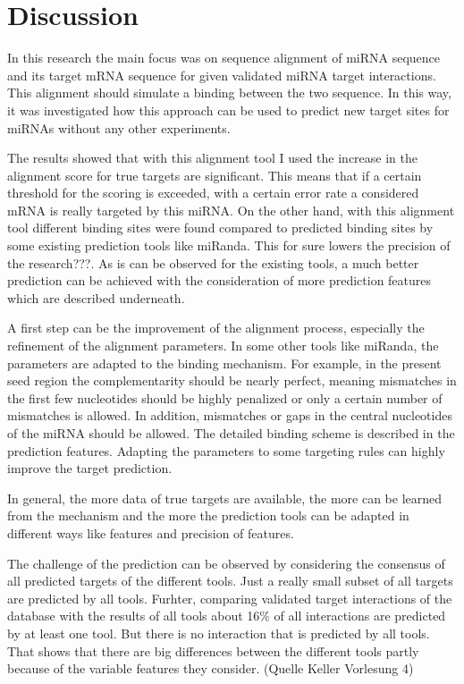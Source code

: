 \documentclass[12pt]{article}
\begin{document}
\section{Discussion}

In this research the main focus was on sequence alignment of miRNA sequence and its target mRNA sequence for given validated miRNA target interactions. This alignment should simulate a binding between the two sequence. In this way, it was investigated how this approach can be used to predict new target sites for miRNAs without any other experiments. 

The results showed that with this alignment tool I used the increase in the alignment score for true targets are significant. This means that if a certain threshold for the scoring is exceeded, with a certain error rate a considered mRNA is really targeted by this miRNA. On the other hand, with this alignment tool different binding sites were found compared to predicted binding sites by some existing prediction tools like miRanda. This for sure lowers the precision of the research???. As is can be observed for the existing tools, a much better prediction can be achieved with the consideration of more prediction features which are described underneath.

A first step can be the improvement of the alignment process, especially the refinement of the alignment parameters. In some other tools like miRanda, the parameters are adapted to the binding mechanism. For example, in the present seed region the complementarity should be nearly perfect, meaning mismatches in the first few nucleotides should be highly penalized or only a certain number of mismatches is allowed. In addition, mismatches or gaps in the central nucleotides of the miRNA should be allowed. The detailed binding scheme is described in the prediction features. Adapting the parameters to some targeting rules can highly improve the target prediction. 

In general, the more data of true targets are available, the more can be learned from the mechanism and the more the prediction tools can be adapted in different ways like features and precision of features.

The challenge of the prediction can be observed by considering the consensus of all predicted targets of the different tools. Just a really small subset of all targets are predicted by all tools. Furhter, comparing validated target interactions of the database with the results of all tools about 16\% of all interactions are predicted by at least one tool. But there is no interaction that is predicted by all tools. That shows that there are big differences between the different tools partly because of the variable features they consider. (Quelle Keller Vorlesung 4) \\\\
\end{document}
